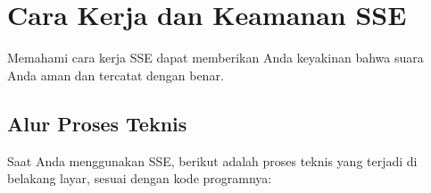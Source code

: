 \section{Cara Kerja dan Keamanan SSE}
\label{sec:cara_kerja_sse}
Memahami cara kerja SSE dapat memberikan Anda keyakinan bahwa suara Anda aman dan tercatat dengan benar.

\subsection{Alur Proses Teknis}
Saat Anda menggunakan SSE, berikut adalah proses teknis yang terjadi di belakang layar, sesuai dengan kode programnya:
